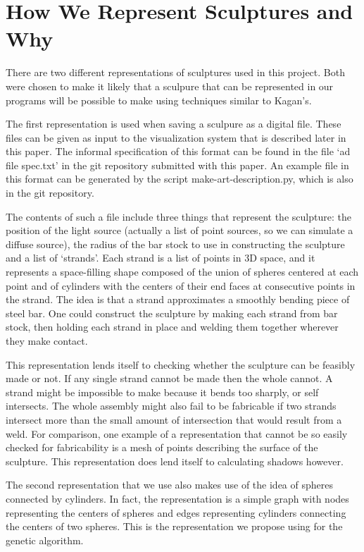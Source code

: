\documentclass[letter,10pt]{article}
\begin{document}
\section{How We Represent Sculptures and Why}
There are two different representations of sculptures used in this project. Both were chosen to make it likely that a sculpure that can be represented in our programs will be possible to make using techniques similar to Kagan's.

The first representation is used when saving a sculpure as a digital file. These files can be given as input to the visualization system that is described later in this paper. The informal specification of this format can be found in the file `ad file spec.txt' in the git repository submitted with this paper. An example file in this format can be generated by the script make-art-description.py, which is also in the git repository.

The contents of such a file include three things that represent the sculpture: the position of the light source (actually a list of point sources, so we can simulate a diffuse source), the radius of the bar stock to use in constructing the sculpture and a list of `strands'. Each strand is a list of points in 3D space, and it represents a space-filling shape composed of the union of spheres centered at each point and of cylinders with the centers of their end faces at consecutive points in the strand. The idea is that a strand approximates a smoothly bending piece of steel bar. One could construct the sculpture by making each strand from bar stock, then holding each strand in place and welding them together wherever they make contact.

This representation lends itself to checking whether the sculpture can be feasibly made or not. If any single strand cannot be made then the whole cannot. A strand might be impossible to make because it bends too sharply, or self intersects. The whole assembly might also fail to be fabricable if two strands intersect more than the small amount of intersection that would result from a weld. For comparison, one example of a representation that cannot be so easily checked for fabricability is a mesh of points describing the surface of the sculpture. This representation does lend itself to calculating shadows however.

The second representation that we use also makes use of the idea of spheres connected by cylinders. In fact, the representation is a simple graph with nodes representing the centers of spheres and edges representing cylinders connecting the centers of two spheres. This is the representation we propose using for the genetic algorithm.
\end{document}
